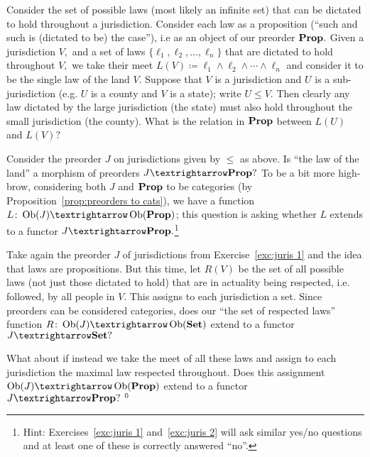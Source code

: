 \documentclass[../main/CT4S-EN-RU]{subfiles}
\begin{document}
\begin{exerciseENG}\label{exc:juris 1}
Consider the set of possible laws (most likely an infinite set) that can be dictated to hold throughout a jurisdiction. Consider each law as a proposition (“such and such is (dictated to be) the case”), i.e as an object of our preorder ${\mathbf{Prop}}.$ Given a jurisdiction $V,$ and a set of laws $\{\ell_1,\ell_2,\ldots,\ell_n\}$ that are dictated to hold throughout $V,$ we take their meet $L(V){\coloneqq}\ell_1\wedge\ell_2\wedge\cdots\wedge\ell_n$ and consider it to be the single law of the land $V.$ Suppose that $V$ is a jurisdiction and $U$ is a sub-jurisdiction (e.g. $U$ is a county and $V$ is a state); write $U\leq V.$ Then clearly any law dictated by the large jurisdiction (the state) must also hold throughout the small jurisdiction (the county).
\sexc What is the relation in ${\mathbf{Prop}}$ between $L(U)$ and $L(V)?$
\item Consider the preorder $J$ on jurisdictions given by $\leq$ as above. Is “the law of the land” a morphism of preorders $J{→}\Prop?$ To be a bit more high-brow, considering both $J$ and ${\mathbf{Prop}}$ to be categories (by Proposition~\ref{prop:preorders to cats}), we have a function $L\colon\Ob(J){→}\Ob(\Prop)$; this question is asking whether $L$ extends to a functor $J{→}\Prop.$\footnote{Hint: Exercises~\ref{exc:juris 1} and~\ref{exc:juris 2} will ask similar yes/no questions and at least one of these is correctly answered “no”.}
\endsexc
\end{exerciseENG}

\begin{exerciseRUS}\label{exc:juris 1}
\end{exerciseRUS}

\begin{exerciseENG}\label{exc:juris 2}
Take again the preorder $J$ of jurisdictions from Exercise~\ref{exc:juris 1} and the idea that laws are propositions. But this time, let $R(V)$ be the set of all possible laws (not just those dictated to hold) that are in actuality being respected, i.e. followed, by all people in $V.$ This assigns to each jurisdiction a set.
\sexc Since preorders can be considered categories, does our “the set of respected laws” function $R\colon\Ob(J){→}\Ob(\Set)$ extend to a functor $J{→}\Set?$ 
\item What about if instead we take the meet of all these laws and assign to each jurisdiction the maximal law respected throughout. Does this assignment $\Ob(J){→}\Ob(\Prop)$ extend to a functor $J{→}\Prop?$$~^{\arabic{footnote}}$
\endsexc
\end{exerciseENG}
\end{document}
